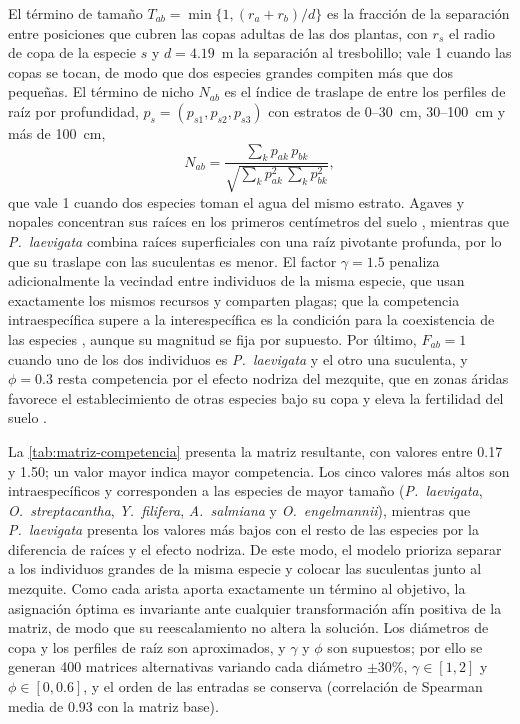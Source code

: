 El término de tamaño $T_{ab}=\min\{1,(r_a+r_b)/d\}$ es la fracción de la separación entre posiciones que cubren las copas adultas de las dos plantas, con $r_s$ el radio de copa de la especie $s$ y $d=4.19$~m la separación al tresbolillo; vale 1 cuando las copas se tocan, de modo que dos especies grandes compiten más que dos pequeñas. El término de nicho $N_{ab}$ es el índice de traslape de \textcite{pianka1973} entre los perfiles de raíz por profundidad, $p_s=(p_{s1},p_{s2},p_{s3})$ con estratos de 0--30~cm, 30--100~cm y más de 100~cm,
\begin{equation}
N_{ab}=\frac{\sum_k p_{ak}\,p_{bk}}{\sqrt{\sum_k p_{ak}^2\,\sum_k p_{bk}^2}},
\end{equation}
que vale 1 cuando dos especies toman el agua del mismo estrato. Agaves y nopales concentran sus raíces en los primeros centímetros del suelo \autocite{snyman2006}, mientras que \textit{P.~laevigata} combina raíces superficiales con una raíz pivotante profunda, por lo que su traslape con las suculentas es menor. El factor $\gamma=1.5$ penaliza adicionalmente la vecindad entre individuos de la misma especie, que usan exactamente los mismos recursos y comparten plagas; que la competencia intraespecífica supere a la interespecífica es la condición para la coexistencia de las especies \autocite{chesson2000}, aunque su magnitud se fija por supuesto. Por último, $F_{ab}=1$ cuando uno de los dos individuos es \textit{P.~laevigata} y el otro una suculenta, y $\phi=0.3$ resta competencia por el efecto nodriza del mezquite, que en zonas áridas favorece el establecimiento de otras especies bajo su copa \autocite{flores2003,padilla2006} y eleva la fertilidad del suelo \autocite{garciasanchez2012}.

La \cref{tab:matriz-competencia} presenta la matriz resultante, con valores entre 0.17 y 1.50; un valor mayor indica mayor competencia. Los cinco valores más altos son intraespecíficos y corresponden a las especies de mayor tamaño (\textit{P.~laevigata}, \textit{O.~streptacantha}, \textit{Y.~filifera}, \textit{A.~salmiana} y \textit{O.~engelmannii}), mientras que \textit{P.~laevigata} presenta los valores más bajos con el resto de las especies por la diferencia de raíces y el efecto nodriza. De este modo, el modelo prioriza separar a los individuos grandes de la misma especie y colocar las suculentas junto al mezquite. Como cada arista aporta exactamente un término al objetivo, la asignación óptima es invariante ante cualquier transformación afín positiva de la matriz, de modo que su reescalamiento no altera la solución. Los diámetros de copa y los perfiles de raíz son aproximados, y $\gamma$ y $\phi$ son supuestos; por ello se generan 400 matrices alternativas variando cada diámetro $\pm30\%$, $\gamma\in[1,2]$ y $\phi\in[0,0.6]$, y el orden de las entradas se conserva (correlación de Spearman media de 0.93 con la matriz base).

